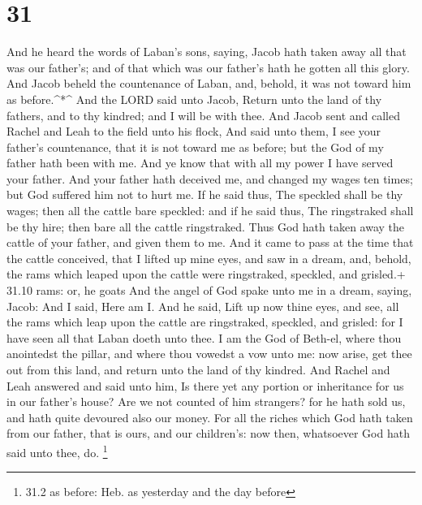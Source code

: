 \hypertarget{section-30}{%
\section{31}\label{section-30}}

 And he heard the words of Laban's sons, saying, Jacob hath
taken away all that was our father's; and of that which was our father's
hath he gotten all this glory.  And Jacob beheld the
countenance of Laban, and, behold, it was not toward him as
before.\^{}*\^{}  And the LORD said unto Jacob, Return unto
the land of thy fathers, and to thy kindred; and I will be with thee.
 And Jacob sent and called Rachel and Leah to the field unto
his flock,  And said unto them, I see your father's
countenance, that it is not toward me as before; but the God of my
father hath been with me.  And ye know that with all my
power I have served your father.  And your father hath
deceived me, and changed my wages ten times; but God suffered him not to
hurt me.  If he said thus, The speckled shall be thy wages;
then all the cattle bare speckled: and if he said thus, The ringstraked
shall be thy hire; then bare all the cattle ringstraked. 
Thus God hath taken away the cattle of your father, and given them to
me.  And it came to pass at the time that the cattle
conceived, that I lifted up mine eyes, and saw in a dream, and, behold,
the rams which leaped upon the cattle were ringstraked, speckled, and
grisled.+ 31.10 rams: or, he goats  And the angel of God
spake unto me in a dream, saying, Jacob: And I said, Here am I.
 And he said, Lift up now thine eyes, and see, all the rams
which leap upon the cattle are ringstraked, speckled, and grisled: for I
have seen all that Laban doeth unto thee.  I am the God of
Beth-el, where thou anointedst the pillar, and where thou vowedst a vow
unto me: now arise, get thee out from this land, and return unto the
land of thy kindred.  And Rachel and Leah answered and said
unto him, Is there yet any portion or inheritance for us in our father's
house?  Are we not counted of him strangers? for he hath
sold us, and hath quite devoured also our money.  For all
the riches which God hath taken from our father, that is ours, and our
children's: now then, whatsoever God hath said unto thee, do.
\footnote{31.2 as before: Heb. as yesterday and the day before}

